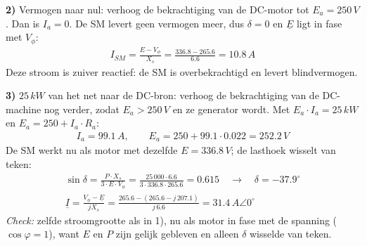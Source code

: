 \begin{oefenblok}
\textbf{2)} Vermogen naar nul: verhoog de bekrachtiging van de DC-motor tot
$E_a = 250\,V$. Dan is $I_a = 0$.
De SM levert geen vermogen meer, dus $\delta = 0$ en $\underline{E}$ ligt in fase met
$V_\phi$:
\begin{align}
    I_{SM} = \frac{E - V_\phi}{X_s} = \frac{336.8 - 265.6}{6.6} = 10.8\,A \tag{4}
\end{align}
Deze stroom is zuiver reactief: de SM is overbekrachtigd en levert blindvermogen.

\textbf{3)} $25\,kW$ van het net naar de DC-bron: verhoog de bekrachtiging van de
DC-machine nog verder, zodat $E_a > 250\,V$ en ze generator wordt.
Met $E_a \cdot I_a = 25\,kW$ en $E_a = 250 + I_a \cdot R_a$:
\begin{align}
    I_a = 99.1\,A, \qquad E_a = 250 + 99.1 \cdot 0.022 = 252.2\,V \tag{5}
\end{align}
De SM werkt nu als motor met dezelfde $E = 336.8\,V$; de lasthoek wisselt van teken:
\begin{align}
    \sin\delta = \frac{P \cdot X_s}{3 \cdot E \cdot V_\phi} = \frac{25\,000 \cdot 6.6}{3 \cdot 336.8 \cdot 265.6} = 0.615
    \quad \rightarrow \quad \delta = -37.9^\circ \tag{6} \\
    \underline{I} = \frac{V_\phi - \underline{E}}{jX_s} = \frac{265.6 - (265.6 - j\,207.1)}{j\,6.6} = 31.4\,A \angle 0^\circ \tag{7}
\end{align}
\textit{Check:} zelfde stroomgrootte als in 1), nu als motor in fase met de spanning
($\cos\varphi = 1$), want $E$ en $P$ zijn gelijk gebleven en alleen $\delta$ wisselde van teken.
\end{oefenblok}

\newpage

